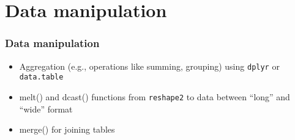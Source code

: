 \documentclass[
	11pt, %
]{beamer}
\begin{document}

\section{Data manipulation}

\begin{frame}
	\frametitle{Data manipulation}
	
	\begin{itemize}
			\item Aggregation (e.g., operations like summing, grouping) using \texttt{dplyr} or \texttt{data.table}
			\item melt() and dcast() functions from \texttt{reshape2} to \href{https://seananderson.ca/2013/10/19/reshape/}{\color{blue}{transform}} data between ``long” and ``wide” format
			\item merge() for joining tables
	\end{itemize}
\end{frame}
\end{document}
